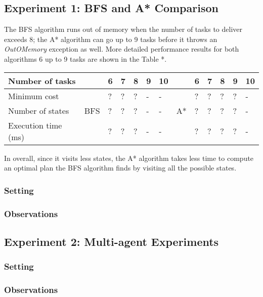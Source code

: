 \documentclass[10pt]{article}
\begin{document}
\subsection{Experiment 1: BFS and A* Comparison}
The BFS algorithm runs out of memory when the number of tasks to deliver exceeds 8; the A* algorithm can go up to 9 tasks before it throws an \textit{OutOMemory} exception as well.
More detailed performance results for both algorithms 6 up to 9 tasks are shown in the Table *.\\

\begin{tabular}{|l|llllll|llllll|}
\hline
Number of tasks & & 6 & 7 & 8 & 9 & 10 & & 6 & 7 & 8 & 9 & 10\\
\hline
Minimum cost & &? & ? & ? & - & - & & ? & ? & ? & ? & -\\
Number of states & BFS & ? & ? & ? & - & - & A* & ? & ? & ? & ? & -\\
Execution time (ms) & &? & ? & ? & - & - & & ? & ? & ? & ? & -\\
\hline
\end{tabular}
\vspace{4mm}

\noindent
In overall, since it visits less states, the A* algorithm takes less time to compute an optimal plan the BFS algorithm finds by visiting all the possible states.



\subsubsection{Setting}

\subsubsection{Observations}


\subsection{Experiment 2: Multi-agent Experiments}

\subsubsection{Setting}

\subsubsection{Observations}
\end{document}
